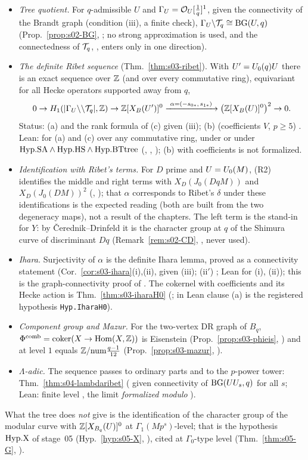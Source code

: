 \begin{itemize}
\item \emph{Tree quotient.} For $q$-admissible $U$ and $\Gamma_U=\mathcal{O}_U[\frac1q]^1$, given the connectivity of the Brandt graph
  (condition (iii), a finite check), $\Gamma_U\backslash\mathcal{T}_q\cong\mathrm{BG}(U,q)$ (Prop.~\ref{prop:s02-BG}, \stproved; no strong approximation is
  used, and the connectedness of $\mathcal{T}_q$, \stcited, enters only in one direction).
\item \emph{The definite Ribet sequence} (Thm.~\ref{thm:s03-ribet}). With $U'=U_0(q)U$ there is an exact sequence over $\mathbb{Z}$
  (and over every commutative ring), equivariant for all Hecke operators supported away from $q$,
  \[0\to H_1(|\GU\quot\cT_q|,\Z)\to\Z[\XB{U'}]^0\xrightarrow{\ \alpha=(-s_{0*},\,s_{1*})\ }\big(\Z[\XB U]^0\big)^{2}\to0 .\]
  Status: (a) and the rank formula of (c) \stproved{} given (iii); (b) (coefficients $V$, $p\ge5$) \stpmc. Lean: \stformal{} for
  (a) and (c) over any commutative ring, under  or under $\mathrm{Hyp.SA}\wedge\mathrm{Hyp.HS}\wedge\mathrm{Hyp.BTtree}$
  (, , );
  (b) with coefficients is not formalized.
\item \emph{Identification with Ribet's terms.} For $D$ prime and $U=U_0(M)$, (R2) identifies the middle and right terms with
  $X_D(J_0(DqM))$ and $X_D(J_0(DM))^{2}$ (\stcited, \cite[Props.~3.1, 3.3]{Ri90}); that $\alpha$ corresponds to Ribet's $\delta$ under
  these identifications is the expected reading (both are built from the two degeneracy maps), not a result of the chapters. The left term is the
  stand-in for $Y$: by \v{C}erednik--Drinfeld it is the character group at $q$ of the Shimura curve of discriminant $Dq$
  (Remark~\ref{rem:s02-CD}, \stcited, never used).
\item \emph{Ihara.} Surjectivity of $\alpha$ is the definite Ihara lemma, proved as a connectivity statement
  (Cor.~\ref{cor:s03-ihara}(i),(ii), \stproved{} given (iii); (ii$'$) \stpmc; Lean \stformal{} for (i), (ii)); this is the
  graph-connectivity proof of \cite[Rem.~3.18]{Ri90}. The cokernel with coefficients and its Hecke action is
  Thm.~\ref{thm:s03-iharaH0} (\stpmc; in Lean clause (a) is the registered hypothesis \texttt{Hyp.IharaH0}).
\item \emph{Component group and Mazur.} For the two-vertex DR graph of $B_q$, $\Phi^{\mathrm{comb}}=\operatorname{coker}(X\to\operatorname{Hom}(X,\mathbb{Z}))$ is Eisenstein
  (Prop.~\ref{prop:s03-phieis}, \stproved) and at level $1$ equals $\mathbb{Z}/\mathrm{num}\frac{q-1}{12}$ (Prop.~\ref{prop:s03-mazur}, \stpmc).
\item \emph{$\Lambda$-adic.} The sequence passes to ordinary parts and to the $p$-power tower: Thm.~\ref{thm:s04-lambdaribet}
  (\stproved{} given connectivity of $\mathrm{BG}(UU_s,q)$ for all $s$; Lean: finite level \stformal, the limit \emph{formalized modulo}
  ).
\end{itemize}
What the tree does \emph{not} give is the identification of the character group of the modular curve with $\mathbb{Z}[X_{B_q}(U)]^0$ at
$\Gamma_1(Mp^s)$-level; that is the hypothesis $\mathrm{Hyp.X}$ of stage~05 (Hyp.~\ref{hyp:s05-X}, \sthyp), cited at $\Gamma_0$-type level
(Thm.~\ref{thm:s05-G}, \stcited).

